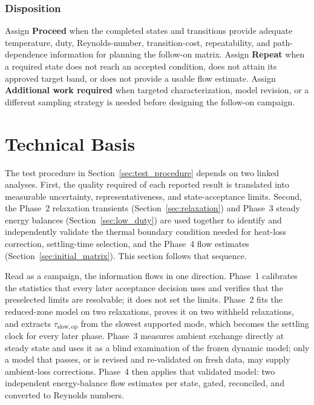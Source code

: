\documentclass[11pt]{article}
\begin{document}
\subsubsection{Disposition}

Assign \textbf{Proceed} when the completed states and transitions provide adequate temperature, duty, Reynolds-number, transition-cost, repeatability, and path-dependence information for planning the follow-on matrix. Assign \textbf{Repeat} when a required state does not reach an accepted condition, does not attain its approved target band, or does not provide a usable flow estimate. Assign \textbf{Additional work required} when targeted characterization, model revision, or a different sampling strategy is needed before designing the follow-on campaign.


\clearpage
\section{Technical Basis}

The test procedure in Section~\ref{sec:test_procedure} depends on two linked analyses. First, the quality required of each reported result is translated into measurable uncertainty, representativeness, and state-acceptance limits. Second, the Phase~2 relaxation transients (Section~\ref{sec:relaxation}) and Phase~3 steady energy balances (Section~\ref{sec:low_duty}) are used together to identify and independently validate the thermal boundary condition needed for heat-loss correction, settling-time selection, and the Phase~4 flow estimates (Section~\ref{sec:initial_matrix}). This section follows that sequence.

Read as a campaign, the information flows in one direction. Phase~1 calibrates the statistics that every later acceptance decision uses and verifies that the preselected limits are resolvable; it does not set the limits. Phase~2 fits the reduced-zone model on two relaxations, proves it on two withheld relaxations, and extracts $\tau_{\mathrm{slow,op}}$ from the slowest supported mode, which becomes the settling clock for every later phase. Phase~3 measures ambient exchange directly at steady state and uses it as a blind examination of the frozen dynamic model; only a model that passes, or is revised and re-validated on fresh data, may supply ambient-loss corrections. Phase~4 then applies that validated model: two independent energy-balance flow estimates per state, gated, reconciled, and converted to Reynolds numbers.
\end{document}

